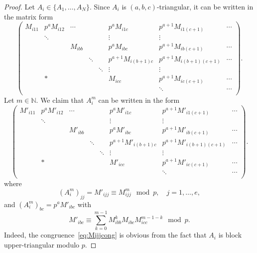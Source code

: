 \documentclass[letterpaper, 11pt, thm-restate]{article}
\numberwithin{equation}{section}
\newcommand{\N}{\mathbb{N}}
\theoremstyle{definition}
\theoremstyle{definition}
\theoremstyle{definition}
\begin{document}
\begin{proof}
    Let $A_i \in \{A_1, \ldots, A_N\}$.
    Since $A_i$ is $(a,b,c)$-triangular, it can be written in the matrix form
    \[
    \begin{pmatrix}
        M_{i11} & p^a M_{i12} & \cdots & & & p^a M_{i1c} & p^{a+1} M_{i1(c+1)} & \cdots \\    
         &  \ddots & & & & \vdots & \vdots \\
         &  & M_{ibb} & & & p^a M_{ibc} & p^{a+1} M_{ib(c+1)} & \cdots \\
         & & & \ddots & & p^{a+1} M_{i(b+1)c} & p^{a+1} M_{i(b+1)(c+1)} & \cdots \\
        & & & & \ddots & \vdots & \vdots \\
        &*&&&& M_{icc} & p^{a+1} M_{ic(c+1)} & \cdots \\
        &&&&& & \ddots & \cdots \\
    \end{pmatrix}.
    \]
    Let $m \in \N$.
    We claim that $A_i^m$ can be written in the form
    \begin{equation}\label{eq:Aim}
    \begin{pmatrix}
        M'_{i11} & p^a M'_{i12} & \cdots & & & p^a M'_{i1c} & p^{a+1} M'_{i1(c+1)} & \cdots \\    
         &  \ddots & & & & \vdots & \vdots \\
         &  & M'_{ibb} & & & p^a M'_{ibc} & p^{a+1} M'_{ib(c+1)} & \cdots \\
         & & & \ddots & & p^{a+1} M'_{i(b+1)c} & p^{a+1} M'_{i(b+1)(c+1)} & \cdots \\
        & & & & \ddots & \vdots & \vdots \\
        &*&&&& M'_{icc} & p^{a+1} M'_{ic(c+1)} & \cdots \\
        &&&&& & \ddots & \cdots \\
    \end{pmatrix}.
    \end{equation}
    where
    \begin{equation}\label{eq:Mijjcong}
    \left(A_i^{m}\right)_{jj} = M'_{ijj} \equiv M_{ijj}^{m} \mod p, \quad j = 1, \ldots, e,
    \end{equation}
    and $\left(A_i^{m}\right)_{bc} = p^a M'_{ibc}$ with
    \begin{equation}\label{eq:Mibccong}
    M'_{ibc} \equiv \sum_{k=0}^{m-1} M_{ibb}^k M_{ibc} M_{icc}^{m-1-k} \mod p.
    \end{equation}
    Indeed, the congruence~\eqref{eq:Mijjcong} is obvious from the fact that $A_i$ is block upper-triangular modulo $p$.

\end{proof}
\end{document}
